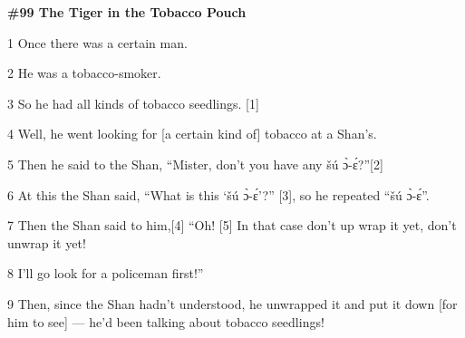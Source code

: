 
{\Large{}\textbf{\#99 The Tiger in the Tobacco Pouch}}

{\Large{}1 Once there was a certain man.}

{\Large{}2 He was a tobacco-smoker.}

{\Large{}3 So he had all kinds of tobacco seedlings. [1]}

{\Large{}4 Well, he went looking for [a certain kind of] tobacco at a Shan's.}

{\Large{}5 Then he said to the Shan, ``Mister, don't you have any šú ɔ̀-ɛ́?''[2]}

{\Large{}6 At this the Shan said, ``What is this `šú ɔ̀-ɛ́'?'' [3], so he
repeated ``šú ɔ̀-ɛ́''.}

{\Large{}7 Then the Shan said to him,[4] ``Oh! [5] In that case don't up wrap it
yet, don't unwrap it yet!}

{\Large{}8 I'll go look for a policeman first!''}

{\Large{}9 Then, since the Shan hadn't understood, he unwrapped it and put it down
[for him to see] --- he'd been talking about tobacco seedlings!}

